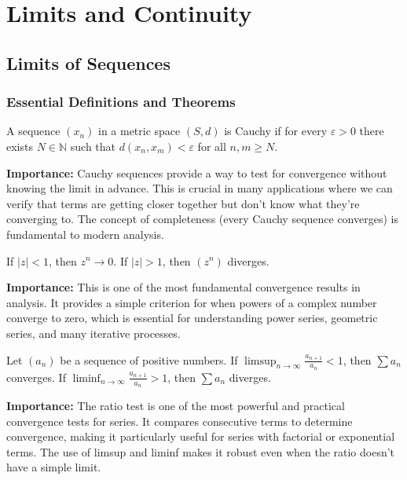 \chapter{Limits and Continuity}

\section{Limits of Sequences}

\subsection*{Essential Definitions and Theorems}



\begin{definition}
A sequence $(x_n)$ in a metric space $(S,d)$ is Cauchy if for every $\varepsilon > 0$ there exists $N \in \mathbb{N}$ such that $d(x_n, x_m) < \varepsilon$ for all $n, m \geq N$.
\end{definition}

\noindent\textbf{Importance:} Cauchy sequences provide a way to test for convergence without knowing the limit in advance. This is crucial in many applications where we can verify that terms are getting closer together but don't know what they're converging to. The concept of completeness (every Cauchy sequence converges) is fundamental to modern analysis.



\begin{theorem}
If $|z| < 1$, then $z^n \to 0$. If $|z| > 1$, then $(z^n)$ diverges.
\end{theorem}

\noindent\textbf{Importance:} This is one of the most fundamental convergence results in analysis. It provides a simple criterion for when powers of a complex number converge to zero, which is essential for understanding power series, geometric series, and many iterative processes.



\begin{theorem}
Let $(a_n)$ be a sequence of positive numbers. If $\limsup_{n \to \infty} \frac{a_{n+1}}{a_n} < 1$, then $\sum a_n$ converges. If $\liminf_{n \to \infty} \frac{a_{n+1}}{a_n} > 1$, then $\sum a_n$ diverges.
\end{theorem}

\noindent\textbf{Importance:} The ratio test is one of the most powerful and practical convergence tests for series. It compares consecutive terms to determine convergence, making it particularly useful for series with factorial or exponential terms. The use of limsup and liminf makes it robust even when the ratio doesn't have a simple limit.







